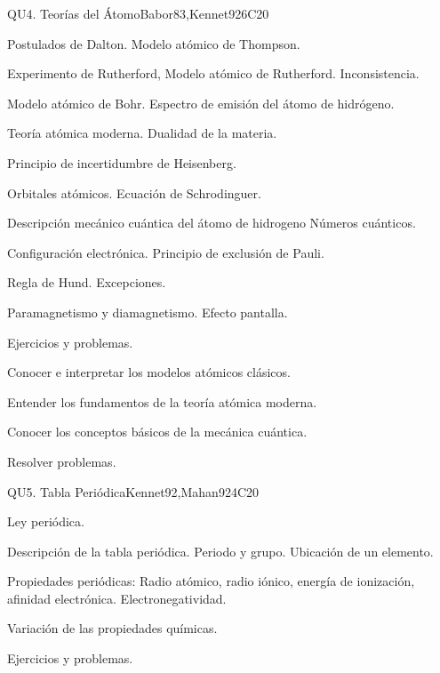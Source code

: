 \begin{syllabus}
\begin{unit}{QU4. Teorías del Átomo}{}{Babor83,Kennet92}{6}{C20}
\begin{topics}
      \item Postulados de Dalton. Modelo atómico de Thompson.
      \item Experimento de Rutherford, Modelo atómico de Rutherford. Inconsistencia.
      \item Modelo atómico de Bohr. Espectro de emisión del átomo de hidrógeno.
      \item Teoría atómica moderna. Dualidad de la materia.
      \item Principio de incertidumbre de Heisenberg.
      \item Orbitales atómicos. Ecuación de Schrodinguer.
      \item Descripción mecánico cuántica del átomo de hidrogeno Números cuánticos.
      \item Configuración electrónica. Principio de exclusión de Pauli.
      \item Regla de Hund. Excepciones.
      \item Paramagnetismo y diamagnetismo. Efecto pantalla.
      \item Ejercicios y problemas.
   \end{topics}

   \begin{learningoutcomes}
      \item Conocer e interpretar los modelos atómicos clásicos.
      \item Entender los fundamentos de la teoría atómica moderna.
      \item Conocer los conceptos básicos de la mecánica cuántica.
      \item Resolver problemas.
   \end{learningoutcomes}
\end{unit}

\begin{unit}{QU5. Tabla Periódica}{}{Kennet92,Mahan92}{4}{C20}
\begin{topics}
	\item Ley periódica.
	\item Descripción de la tabla periódica. Periodo y grupo. Ubicación de un elemento.
	\item Propiedades periódicas: Radio atómico, radio iónico, energía de ionización, afinidad electrónica. Electronegatividad.
	\item Variación de las propiedades químicas.
	\item Ejercicios y problemas.
   \end{topics}


\end{unit}
\end{syllabus}
